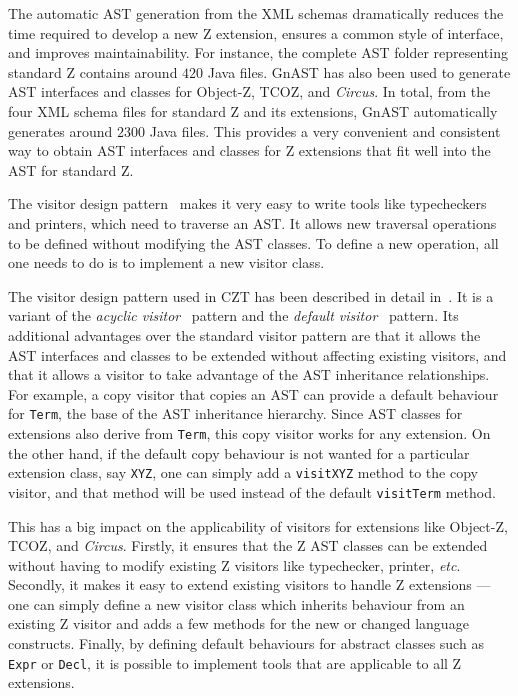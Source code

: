 \documentclass{llncs}
\newcommand{\Circus}{{\sf\slshape Circus}}
\newcommand{\Interface}[1]{\texttt{#1}}
\begin{document}
  The automatic AST generation from the XML schemas dramatically
  reduces the time required to develop a new Z extension, ensures a
  common style of interface, and improves maintainability.  For
  instance, the complete AST folder representing standard Z contains
  around $420$ Java files.  GnAST has also been used to generate AST
  interfaces and classes for Object-Z, TCOZ, and \Circus.  In total,
  from the four XML schema files for standard Z and its extensions,
  GnAST automatically generates around $2300$ Java files.  This
  provides a very convenient and consistent way to obtain AST interfaces
  and classes for Z extensions that fit well into the AST for standard Z.

  The visitor design pattern~\cite{GamEA:95,MaiCha:01} makes it very
  easy to write tools like typecheckers and printers, which need to
  traverse an AST.  It allows new traversal operations to be defined
  without modifying the AST classes.  To define a new operation, all
  one needs to do is to implement a new visitor class.

  The visitor design pattern used in CZT has been described in detail
  in~\cite{czt}.  It is a variant of the \emph{acyclic
  visitor}~\cite{Mar:97} pattern and the \emph{default
  visitor}~\cite{Nor:97} pattern.  Its additional advantages over the
  standard visitor pattern are that it allows the AST interfaces and
  classes to be extended without affecting existing visitors, and that
  it allows a visitor to take advantage of the AST inheritance
  relationships.  For example, a copy visitor that copies an AST can
  provide a default behaviour for \Interface{Term}, the base of the
  AST inheritance hierarchy.  Since AST classes for extensions also
  derive from \Interface{Term}, this copy visitor works for any
  extension.  On the other hand, if the default copy behaviour is not
  wanted for a particular extension class, say \texttt{XYZ}, one can
  simply add a \texttt{visitXYZ} method to the copy visitor, and that
  method will be used instead of the default \texttt{visitTerm}
  method.

  This has a big impact on the applicability of visitors for
  extensions like Object-Z, TCOZ, and \Circus.  Firstly, it ensures
  that the Z AST classes can be extended without having to modify
  existing Z visitors like typechecker, printer, \textit{etc}.
  Secondly, it makes it easy to extend existing visitors
  to handle Z extensions --- one can simply define a new visitor class
  which inherits behaviour from an existing Z visitor and adds a few
  methods for the new or changed language constructs.
  Finally, by defining default behaviours for abstract classes such as
  \texttt{Expr} or \texttt{Decl}, it is possible to implement tools
  that are applicable to all Z extensions.
\end{document}
